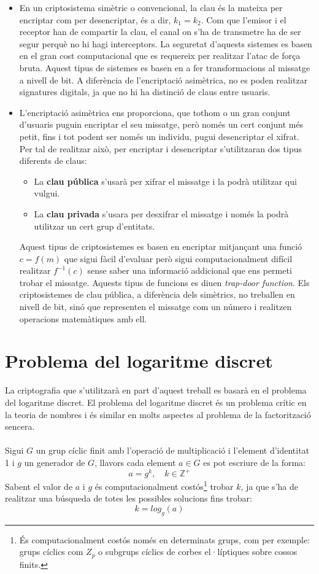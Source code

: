\documentclass{article}
\begin{document}
\begin{itemize}
	\item En un criptosistema simètric o convencional, la clau és la mateixa per encriptar com per desencriptar, és a dir, $k_1 = k_2$. Com que l'emisor i el receptor han de compartir la clau, el canal on s'ha de transmetre ha de ser segur perquè no hi hagi interceptors. La seguretat d'aquests sistemes es basen en el gran cost computacional que es requereix per realitzar l'atac de força bruta. Aquest tipus de sistemes es basen en a fer transformacions al missatge a nivell de bit. A diferència de l'encriptació asimètrica, no es poden realitzar signatures digitals, ja que no hi ha distinció de claus entre usuaris.
	\item L'encriptació asimètrica ens proporciona, que tothom o un gran conjunt d'usuaris puguin encriptar el seu missatge, però només un cert conjunt més petit, fins i tot podent ser només un individu, pugui desencriptar el xifrat. Per tal de realitzar això, per encriptar i desencriptar s'utilitzaran dos tipus diferents de claus:
	\begin{itemize}
		\item La \textbf{clau pública} s'usarà per xifrar el missatge i la podrà utilitzar qui vulgui.
		\item La \textbf{clau privada} s'usara per desxifrar el missatge i només la podrà utilitzar un cert grup d'entitats.
	\end{itemize}
	Aquest tipus de criptosistemes es basen en encriptar mitjançant una funció $c = f(m)$ que sigui fàcil d'evaluar però sigui computacionalment difícil realitzar $f^{-1}(c)$ sense saber una informació addicional que ens permeti trobar el missatge. Aquests tipus de funcions es diuen \textit{trap-door function}.
	Els criptosistemes de clau pública, a diferència dels simètrics, no treballen en nivell de bit, sinó que representen el missatge com un número i realitzen operacions matemàtiques amb ell. 
\end{itemize}

\section{Problema del logaritme discret}
La criptografia que s'utilitzarà en part d'aquest treball es basarà en el problema del logaritme discret.
El problema del logaritme discret és un problema crític en la teoria de nombres i és similar en molts aspectes al problema de la factorització sencera.
\\
\\
Sigui $G$ un grup cíclic finit amb l'operació de multiplicació i l'element d'identitat 1 i $g$ un generador de $G$, llavors cada element $a \in G$ es pot escriure de la forma:
\[a = g^k, \quad k \in \mathbb{Z^+} \] 
Sabent el valor de $a$ i $g$ és computacionalment costós\footnote{És computacionalment costós només en determinats grups, com per exemple: grups cíclics com $Z_p$ o subgrups cíclics de corbes el·líptiques sobre cossos finits. %
} trobar $k$, ja que s'ha de realitzar una búsqueda de totes les possibles solucions fins trobar:
\[k = log_g(a)\]
\end{document}
